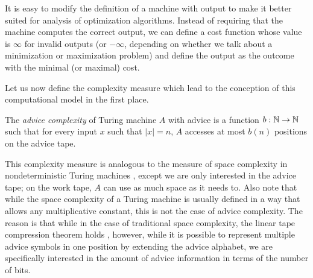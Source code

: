 It is easy to modify the definition of a machine with output to make it
better suited for analysis of optimization algorithms. Instead of
requiring that the machine computes the correct output, we can define a
cost function whose value is $\infty$ for invalid outputs (or $-\infty$,
depending on whether we talk about a minimization or maximization problem)
and define the output as the outcome with the minimal (or maximal) cost.

Let us now define the complexity measure which lead to the conception of
this computational model in the first place.

\begin{definition}\label{definition:offline-advice-complexity}
    The \emph{advice complexity} of Turing machine $A$ with advice is a
    function $b: \mathbb{N} \to \mathbb{N}$ such that for every input $x$ such that $|x| =
    n$, $A$ accesses at most $b(n)$ positions on the advice tape.
\end{definition}

This complexity measure is analogous to the measure of space complexity in
nondeterministic Turing machines \cite{nspace}, except we are only
interested in the advice tape; on the work tape, $A$ can use as much space
as it needs to. Also note that while the space complexity of a Turing
machine is usually defined in a way that allows any multiplicative
constant, this is not the case of advice complexity. The reason is that
while in the case of traditional space complexity, the linear tape
compression theorem holds \cite{tape-compression}, however, while it is
possible to represent multiple advice symbols in one position by extending
the advice alphabet, we are specifically interested in the amount of
advice information in terms of the number of bits.
